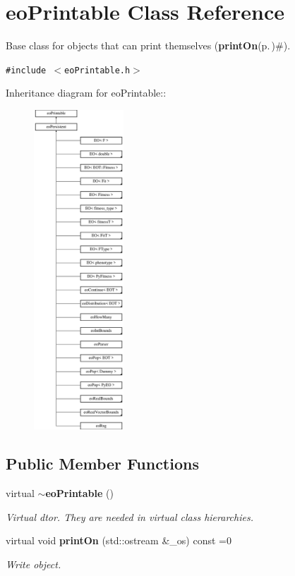 \section{eo\-Printable Class Reference}
\label{classeo_printable}
Base class for objects that can print themselves ({\bf print\-On}{\rm (p.\,\pageref{classeo_printable_a1})}\#).  


{\tt \#include $<$eo\-Printable.h$>$}

Inheritance diagram for eo\-Printable::\begin{figure}[H]
\begin{center}
\leavevmode
\includegraphics[height=12cm]{classeo_printable}
\end{center}
\end{figure}
\subsection*{Public Member Functions}
\begin{CompactItemize}
\item 
virtual {\bf $\sim$eo\-Printable} ()\label{classeo_printable_a0}

\begin{CompactList}\small\item\em Virtual dtor. They are needed in virtual class hierarchies. \item\end{CompactList}\item 
virtual void {\bf print\-On} (std::ostream \&\_\-os) const =0
\begin{CompactList}\small\item\em Write object. \item\end{CompactList}\end{CompactItemize}



